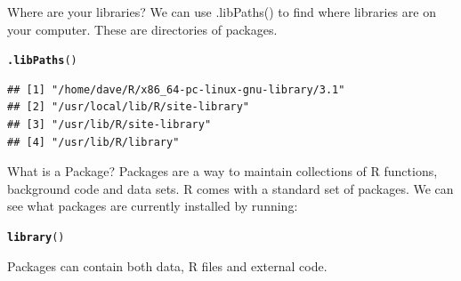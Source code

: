 \documentclass{beamer}\usepackage[]{graphicx}\usepackage[]{color}
\makeatletter
\newcommand{\hlstd}[1]{\textcolor[rgb]{0.345,0.345,0.345}{#1}}%
\newcommand{\hlkwd}[1]{\textcolor[rgb]{0.737,0.353,0.396}{\textbf{#1}}}%
\newenvironment{kframe}{%
 \def\at@end@of@kframe{}%
 \ifinner\ifhmode%
  \def\at@end@of@kframe{\end{minipage}}%
  \begin{minipage}{\columnwidth}%
 \fi\fi%
 \def\FrameCommand##1{\hskip\@totalleftmargin \hskip-\fboxsep
 \colorbox{shadecolor}{##1}\hskip-\fboxsep
     \hskip-\linewidth \hskip-\@totalleftmargin \hskip\columnwidth}%
 \MakeFramed {\advance\hsize-\width
   \@totalleftmargin\z@ \linewidth\hsize
   \@setminipage}}%
 {\par\unskip\endMakeFramed%
 \at@end@of@kframe}
\newenvironment{knitrout}{}{} %
\makeatother
\begin{document}
\begin{frame}[fragile]{Where are your libraries?}
We can use .libPaths() to find where libraries are on your computer.
These are directories of packages.
\begin{knitrout}
\color{fgcolor}\begin{kframe}
\begin{alltt}
\hlkwd{.libPaths}\hlstd{()}
\end{alltt}
\begin{verbatim}
## [1] "/home/dave/R/x86_64-pc-linux-gnu-library/3.1"
## [2] "/usr/local/lib/R/site-library"               
## [3] "/usr/lib/R/site-library"                     
## [4] "/usr/lib/R/library"
\end{verbatim}
\end{kframe}
\end{knitrout}

\end{frame}


\begin{frame}[fragile]{What is a Package?}
Packages are a way to maintain collections of R functions, background code and data sets.
\linebreak
R comes with a standard set of packages. We can see what packages are currently installed by running:
\begin{knitrout}
\color{fgcolor}\begin{kframe}
\begin{alltt}
\hlkwd{library}\hlstd{()}
\end{alltt}
\end{kframe}
\end{knitrout}

Packages can contain both data, R files and external code.
\end{frame}
\end{document}
